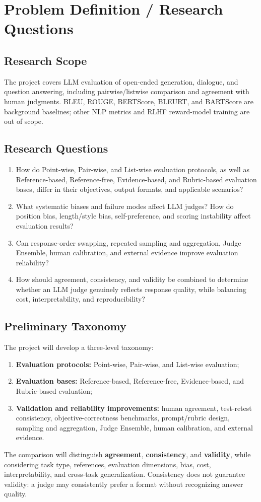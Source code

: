 \documentclass[10pt]{article}
\begin{document}
\section{Problem Definition / Research Questions}
\subsection{Research Scope}
The project covers LLM evaluation of open-ended generation, dialogue, and question answering, including pairwise/listwise comparison and agreement with human judgments. BLEU, ROUGE, BERTScore, BLEURT, and BARTScore are background baselines; other NLP metrics and RLHF reward-model training are out of scope.

\subsection{Research Questions}
\begin{enumerate}
\item How do Point-wise, Pair-wise, and List-wise evaluation protocols, as well as Reference-based, Reference-free, Evidence-based, and Rubric-based evaluation bases, differ in their objectives, output formats, and applicable scenarios?
\item What systematic biases and failure modes affect LLM judges? How do position bias, length/style bias, self-preference, and scoring instability affect evaluation results?
\item Can response-order swapping, repeated sampling and aggregation, Judge Ensemble, human calibration, and external evidence improve evaluation reliability?
\item How should agreement, consistency, and validity be combined to determine whether an LLM judge genuinely reflects response quality, while balancing cost, interpretability, and reproducibility?
\end{enumerate}

\subsection{Preliminary Taxonomy}
The project will develop a three-level taxonomy:
\begin{enumerate}
\item \textbf{Evaluation protocols:} Point-wise, Pair-wise, and List-wise evaluation;
\item \textbf{Evaluation bases:} Reference-based, Reference-free, Evidence-based, and Rubric-based evaluation;
\item \textbf{Validation and reliability improvements:} human agreement, test-retest consistency, objective-correctness benchmarks, prompt/rubric design, sampling and aggregation, Judge Ensemble, human calibration, and external evidence.
\end{enumerate}
The comparison will distinguish \textbf{agreement}, \textbf{consistency}, and \textbf{validity}, while considering task type, references, evaluation dimensions, bias, cost, interpretability, and cross-task generalization. Consistency does not guarantee validity: a judge may consistently prefer a format without recognizing answer quality.
\end{document}
